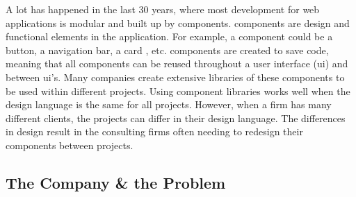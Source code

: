 A lot has happened in the last 30 years, where most development for web applications is modular and built up by \glspl{component}. \Glspl{component} are design and functional elements in the application. For example, a \gls{component} could be a button, a navigation bar, a card \cite{babichSimpleDesignTips2020}, etc. \Glspl{component} are created to save code, meaning that all \glspl{component} can be reused throughout a user interface (\acrshort{ui}) and between \acrshort{ui}'s. Many companies create extensive libraries of these \glspl{component} to be used within different projects. Using \gls{component} libraries works well when the design language is the same for all projects. However, when a firm has many different clients, the projects can differ in their design language. The differences in design result in the consulting firms often needing to redesign their \glspl{component} between projects. 





\subsection{The Company \& the Problem}
\label{sub:company}




